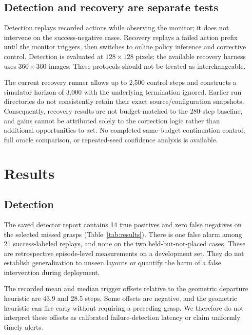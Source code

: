 \documentclass[10pt,twocolumn]{article}
\begin{document}
\subsection{Detection and recovery are separate tests}
Detection replays recorded actions while observing the monitor; it does not intervene on the success-negative cases. Recovery replays a failed action prefix until the monitor triggers, then switches to online policy inference and corrective control. Detection is evaluated at $128\times128$ pixels; the available recovery harness uses $360\times360$ images. These protocols should not be treated as interchangeable.

The current recovery runner allows up to 2,500 control steps and constructs a simulator horizon of 3,000 with the underlying termination ignored. Earlier run directories do not consistently retain their exact source/configuration snapshots. Consequently, recovery results are not budget-matched to the 280-step baseline, and gains cannot be attributed solely to the correction logic rather than additional opportunities to act. No completed same-budget continuation control, full oracle comparison, or repeated-seed confidence analysis is available.

\section{Results}
\subsection{Detection}
The saved detector report contains 14 true positives and zero false negatives on the selected missed grasps (Table~\ref{tab:results}). There is one false alarm among 21 success-labeled replays, and none on the two held-but-not-placed cases. These are retrospective episode-level measurements on a development set. They do not establish generalization to unseen layouts or quantify the harm of a false intervention during deployment.

The recorded mean and median trigger offsets relative to the geometric departure heuristic are 43.9 and 28.5 steps. Some offsets are negative, and the geometric heuristic can fire early without requiring a preceding grasp. We therefore do not interpret these offsets as calibrated failure-detection latency or claim uniformly timely alerts.
\end{document}
